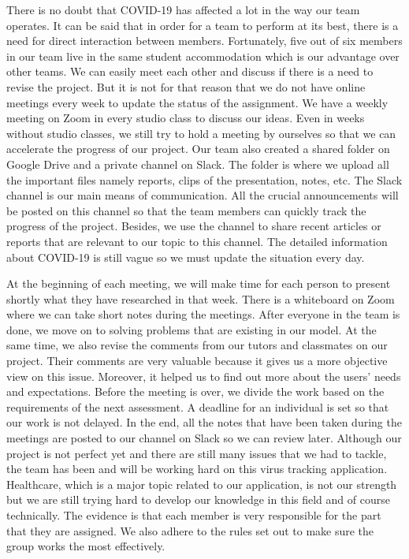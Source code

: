   \par There is no doubt that COVID-19 has affected a lot in the way our team operates. It can be said that in order for a team to perform at its best, there is a need for direct interaction between members. Fortunately, five out of six members in our team live in the same student accommodation which is our advantage over other teams. We can easily meet each other and discuss if there is a need to revise the project. But it is not for that reason that we do not have online meetings every week to update the status of the assignment. We have a weekly meeting on Zoom in every studio class to discuss our ideas. Even in weeks without studio classes, we still try to hold a meeting by ourselves so that we can accelerate the progress of our project. Our team also created a shared folder on Google Drive and a private channel on Slack. The folder is where we upload all the important files namely reports, clips of the presentation, notes, etc. The Slack channel is our main means of communication. All the crucial announcements will be posted on this channel so that the team members can quickly track the progress of the project. Besides, we use the channel to share recent articles or reports that are relevant to our topic to this channel. The detailed information about COVID-19 is still vague so we must update the situation every day.
  \par At the beginning of each meeting, we will make time for each person to present shortly what they have researched in that week. There is a whiteboard on Zoom where we can take short notes during the meetings. After everyone in the team is done, we move on to solving problems that are existing in our model. At the same time, we also revise the comments from our tutors and classmates on our project. Their comments are very valuable because it gives us a more objective view on this issue. Moreover, it helped us to find out more about the users’ needs and expectations. Before the meeting is over, we divide the work based on the requirements of the next assessment. A deadline for an individual is set so that our work is not delayed. In the end, all the notes that have been taken during the meetings are posted to our channel on Slack so we can review later. Although our project is not perfect yet and there are still many issues that we had to tackle, the team has been and will be working hard on this virus tracking application. Healthcare, which is a major topic related to our application, is not our strength but we are still trying hard to develop our knowledge in this field and of course technically. The evidence is that each member is very responsible for the part that they are assigned. We also adhere to the rules set out to make sure the group works the most effectively.
